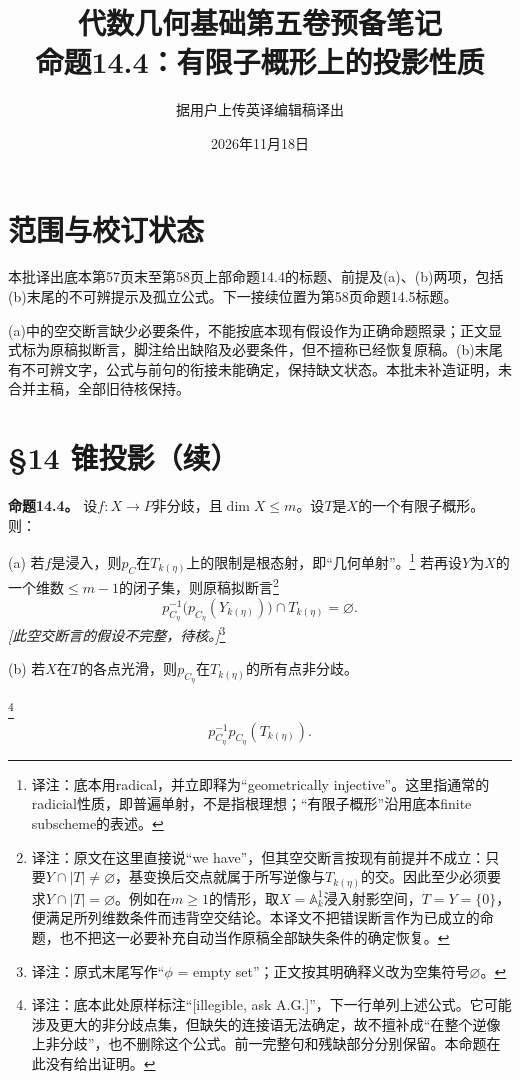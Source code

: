 \documentclass[openany,fontset=fandol]{ctexbook}
\newcommand{\note}[1]{\footnote{译注：#1}}
\begin{document}
\title{代数几何基础第五卷预备笔记\\命题14.4：有限子概形上的投影性质}
\author{据用户上传英译编辑稿译出}
\date{2026年11月18日}
\maketitle
\chapter*{范围与校订状态}
本批译出底本第57页末至第58页上部命题14.4的标题、前提及(a)、(b)两项，包括(b)末尾的不可辨提示及孤立公式。下一接续位置为第58页命题14.5标题。

(a)中的空交断言缺少必要条件，不能按底本现有假设作为正确命题照录；正文显式标为原稿拟断言，脚注给出缺陷及必要条件，但不擅称已经恢复原稿。(b)末尾有不可辨文字，公式与前句的衔接未能确定，保持缺文状态。本批未补造证明，未合并主稿，全部旧待核保持。
\chapter*{§14 锥投影（续）}
\noindent\textbf{命题14.4。}
设$f:X\to P$非分歧，且$\dim X\leq m$。设$T$是$X$的一个有限子概形。则：

\noindent(a) 若$f$是浸入，则$p_C$在$T_{k(\eta)}$上的限制是根态射，即“几何单射”。\note{底本用radical，并立即释为“geometrically injective”。这里指通常的radicial性质，即普遍单射，不是指根理想；“有限子概形”沿用底本finite subscheme的表述。}
若再设$Y$为$X$的一个维数$\leq m-1$的闭子集，则原稿拟断言\note{原文在这里直接说“we have”，但其空交断言按现有前提并不成立：只要$Y\cap|T|\ne\varnothing$，基变换后交点就属于所写逆像与$T_{k(\eta)}$的交。因此至少必须要求$Y\cap|T|=\varnothing$。例如在$m\geq1$的情形，取$X=\mathbb A^1_k$浸入射影空间，$T=Y=\{0\}$，便满足所列维数条件而违背空交结论。本译文不把错误断言作为已成立的命题，也不把这一必要补充自动当作原稿全部缺失条件的确定恢复。}
\[
p_{C_\eta}^{-1}\bigl(p_{C_\eta}(Y_{k(\eta)})\bigr)
\cap T_{k(\eta)}=\varnothing.
\]
\noindent\textit{[此空交断言的假设不完整，待核。]}\note{原式末尾写作“$\phi$ = empty set”；正文按其明确释义改为空集符号$\varnothing$。}

\noindent(b) 若$X$在$T$的各点光滑，则$p_{C_\eta}$在$T_{k(\eta)}$的所有点非分歧。

\note{底本此处原样标注“[illegible, ask A.G.]”，下一行单列上述公式。它可能涉及更大的非分歧点集，但缺失的连接语无法确定，故不擅补成“在整个逆像上非分歧”，也不删除这个公式。前一完整句和残缺部分分别保留。本命题在此没有给出证明。}
\[
p_{C_\eta}^{-1}p_{C_\eta}(T_{k(\eta)}).
\]
\end{document}
